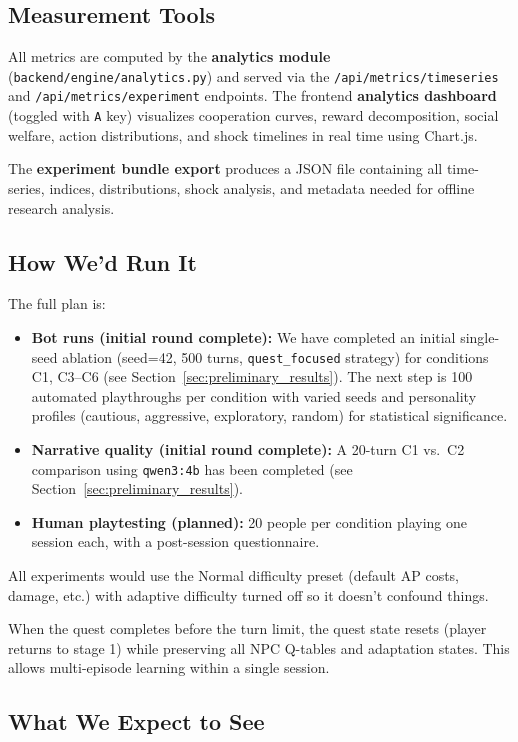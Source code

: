 \subsection{Measurement Tools}

All metrics are computed by the \textbf{analytics module} (\texttt{backend/engine/analytics.py}) and served via the \texttt{/api/metrics/timeseries} and \texttt{/api/metrics/experiment} endpoints. The frontend \textbf{analytics dashboard} (toggled with \texttt{A} key) visualizes cooperation curves, reward decomposition, social welfare, action distributions, and shock timelines in real time using Chart.js.

The \textbf{experiment bundle export} produces a JSON file containing all time-series, indices, distributions, shock analysis, and metadata needed for offline research analysis.

\subsection{How We'd Run It}

The full plan is:
\begin{itemize}
    \item \textbf{Bot runs (initial round complete):} We have completed an initial single-seed ablation (seed=42, 500 turns, \texttt{quest\_focused} strategy) for conditions C1, C3--C6 (see Section~\ref{sec:preliminary_results}). The next step is 100 automated playthroughs per condition with varied seeds and personality profiles (cautious, aggressive, exploratory, random) for statistical significance.
    \item \textbf{Narrative quality (initial round complete):} A 20-turn C1 vs.\ C2 comparison using \texttt{qwen3:4b} has been completed (see Section~\ref{sec:preliminary_results}).
    \item \textbf{Human playtesting (planned):} 20 people per condition playing one session each, with a post-session questionnaire.
\end{itemize}

All experiments would use the Normal difficulty preset (default AP costs, damage, etc.) with adaptive difficulty turned off so it doesn't confound things.

When the quest completes before the turn limit, the quest state resets (player returns to stage 1) while preserving all NPC Q-tables and adaptation states. This allows multi-episode learning within a single session.

\subsection{What We Expect to See}

